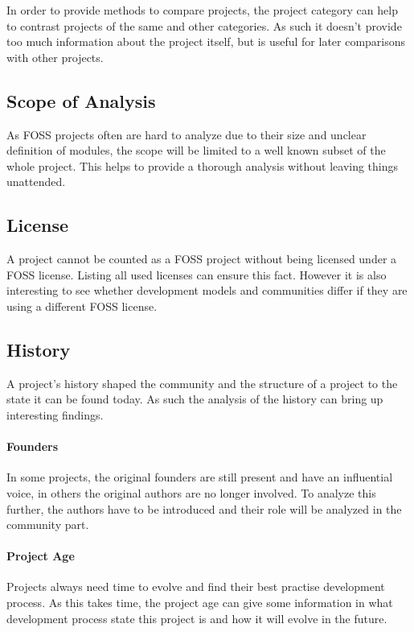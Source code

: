 In order to provide methods to compare projects, the project category can help
to contrast projects of the same and other categories. As such it doesn't
provide too much information about the project itself, but is useful for later
comparisons with other projects.

\subsection{Scope of Analysis}

As \ac{FOSS} projects often are hard to analyze due to their size and unclear
definition of modules, the scope will be limited to a well known subset of the
whole project. This helps to provide a thorough analysis without leaving things
unattended.

\subsection{License}

A project cannot be counted as a \ac{FOSS} project without being licensed under
a \ac{FOSS} license. Listing all used licenses can ensure this fact. However it
is also interesting to see whether development models and communities differ if
they are using a different \ac{FOSS} license.

\subsection{History}

A project's history shaped the community and the structure of a project to the
state it can be found today. As such the analysis of the history can bring up
interesting findings.

\paragraph{Founders}

In some projects, the original founders are still present and have an
influential voice, in others the original authors are no longer involved. To
analyze this further, the authors have to be introduced and their role will be
analyzed in the community part.

\paragraph{Project Age}

Projects always need time to evolve and find their best practise development
process. As this takes time, the project age can give some information in what
development process state this project is and how it will evolve in the future.

